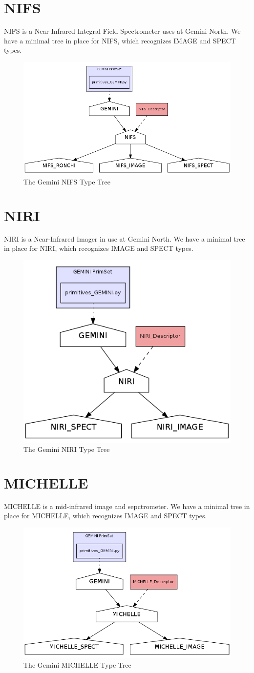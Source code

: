 \documentclass[letterpaper,10pt,english]{sphinxmanual}
\begin{document}
\section{NIFS}
\label{appendix_typegraphs:nifs}
NIFS is a Near-Infrared Integral Field Spectrometer  uses at Gemini North.  We
have a minimal tree in place for NIFS, which recognizes IMAGE and SPECT types.
\begin{figure}[htbp]
\centering
\capstart

\includegraphics[width=0.300\linewidth]{NIFS-tree-pd.png}
\caption{The Gemini NIFS Type Tree}\end{figure}


\section{NIRI}
\label{appendix_typegraphs:niri}
NIRI is a Near-Infrared Imager in use at Gemini North. We have a minimal tree in
place for NIRI, which recognizes IMAGE and SPECT types.
\begin{figure}[htbp]
\centering
\capstart

\includegraphics[width=0.300\linewidth]{NIRI-tree-pd.png}
\caption{The Gemini NIRI Type Tree}\end{figure}


\section{MICHELLE}
\label{appendix_typegraphs:michelle}
MICHELLE is a mid-infrared image and sepctrometer. We have a minimal tree in
place for MICHELLE, which recognizes IMAGE and SPECT types.
\begin{figure}[htbp]
\centering
\capstart

\includegraphics[width=0.300\linewidth]{MICHELLE-tree-pd.png}
\caption{The Gemini MICHELLE Type Tree}\end{figure}
\end{document}
